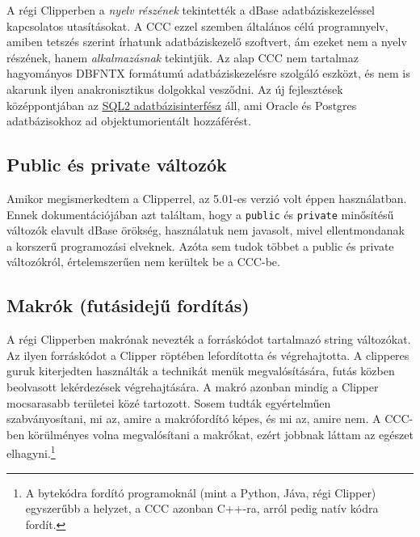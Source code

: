 A régi Clipperben a {\em nyelv részének\/} tekintették 
a dBase  adatbáziskezeléssel kapcsolatos utasításokat. 
A CCC ezzel szemben általános célú  programnyelv,
amiben tetszés szerint írhatunk adatbáziskezelő szoftvert,
ám ezeket nem a nyelv részének, hanem {\em  alkalmazásnak\/} 
tekintjük. Az alap CCC nem tartalmaz  hagyományos DBFNTX 
formátumú adatbáziskezelésre szolgáló eszközt, és nem is akarunk 
ilyen anakronisztikus  dolgokkal vesződni. 
Az új fejlesztések középpontjában az 
\href{sql2.html}{SQL2  adatbázisinterfész}
áll, ami  Oracle és Postgres adatbázisokhoz ad objektumorientált 
hozzáférést.


\subsection{Public és private változók}

Amikor megismerkedtem a Clipperrel, 
az 5.01-es verzió volt éppen  használatban.
Ennek dokumentációjában azt találtam, hogy a \verb!public! és
\verb!private! minősítésű változók elavult dBase örökség, használatuk 
nem javasolt, mivel ellentmondanak a korszerű programozási elveknek.
Azóta sem tudok többet a public és private változókról,
értelemszerűen nem kerültek be a CCC-be.




\subsection{Makrók (futásidejű fordítás)}

A régi Clipperben makrónak nevezték a forráskódot tartalmazó
string változókat.  Az ilyen forráskódot a Clipper röptében 
lefordította és végrehajtotta.  A clipperes guruk kiterjedten használták
a technikát  menük megvalósítására, futás közben beolvasott
lekérdezések végrehajtására. A makró azonban mindig a Clipper 
mocsarasabb  területei közé tartozott. Sosem tudták egyértelműen 
szabványosítani, mi az,  amire a makrófordító képes, és mi az, amire nem.
A CCC-ben körülményes volna megvalósítani a makrókat, ezért jobbnak láttam 
az egészet elhagyni.\footnote{A bytekódra fordító programoknál
(mint a Python, Jáva, régi Clipper) egyszerűbb a helyzet, a CCC
azonban C++-ra, arról pedig natív kódra fordít.}





